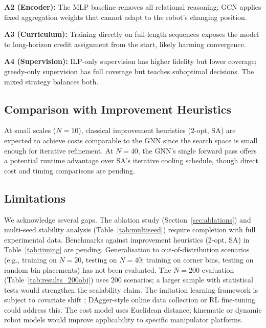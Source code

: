 \documentclass[conference]{IEEEtran}
\begin{document}
\textbf{A2 (Encoder):} The MLP baseline removes all relational reasoning; GCN applies fixed aggregation weights that cannot adapt to the robot's changing position.

\textbf{A3 (Curriculum):} Training directly on full-length sequences exposes the model to long-horizon credit assignment from the start, likely harming convergence.

\textbf{A4 (Supervision):} ILP-only supervision has higher fidelity but lower coverage; greedy-only supervision has full coverage but teaches suboptimal decisions. The mixed strategy balances both.

\subsection{Comparison with Improvement Heuristics}

At small scales ($N{=}10$), classical improvement heuristics (2-opt, SA) are expected to achieve costs comparable to the GNN since the search space is small enough for iterative refinement. At $N{=}40$, the GNN's single forward pass offers a potential runtime advantage over SA's iterative cooling schedule, though direct cost and timing comparisons are pending.

\subsection{Limitations}

We acknowledge several gaps. The ablation study (Section~\ref{sec:ablations}) and multi-seed stability analysis (Table~\ref{tab:multiseed}) require completion with full experimental data. Benchmarks against improvement heuristics (2-opt, SA) in Table~\ref{tab:timing} are pending. Generalisation to out-of-distribution scenarios (e.g., training on $N{=}20$, testing on $N{=}40$; training on corner bins, testing on random bin placements) has not been evaluated. The $N{=}200$ evaluation (Table~\ref{tab:results_200obj}) uses 200 scenarios; a larger sample with statistical tests would strengthen the scalability claim. The imitation learning framework is subject to covariate shift \cite{ross2011dagger}; DAgger-style online data collection or RL fine-tuning could address this. The cost model uses Euclidean distance; kinematic or dynamic robot models would improve applicability to specific manipulator platforms.
\end{document}
